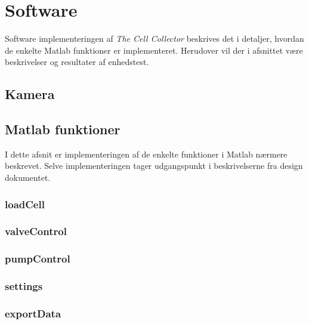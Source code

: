\section{Software}
Software implementeringen af \textit{The Cell Collector} beskrives det i detaljer, hvordan de enkelte Matlab funktioner er implementeret. Herudover vil der i afsnittet være beskrivelser og resultater af enhedstest. 
 
\subsection{Kamera}



\newpage
\subsection{Matlab funktioner}
I dette afsnit er implementeringen af de enkelte funktioner i Matlab nærmere beskrevet. Selve implementeringen tager udgangspunkt i beskrivelserne fra design dokumentet. %





 

\subsubsection{loadCell}

\subsubsection{valveControl}

\subsubsection{pumpControl}

\subsubsection{settings}
\subsubsection{exportData}


